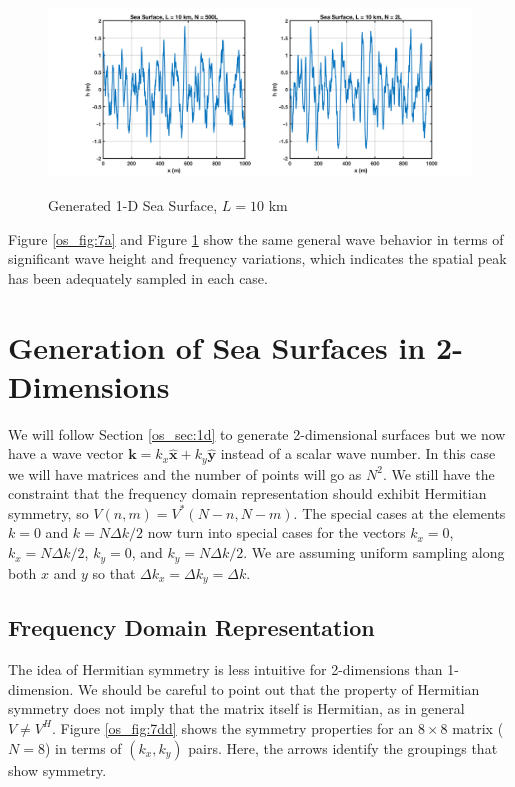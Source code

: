 \begin{figure}[H]
  \begin{center}
\includegraphics[width=6in]{../media/Ocean_Surface/sea_surface_10000.png}
  \end{center}
  \renewcommand{\baselinestretch}{1} \small\normalsize
  \begin{quote}
    \caption[Generated 1-D Sea Surface, $L = 10$ km]{Generated 1-D Sea Surface, $L = 10$ km\label{os_fig:7aa}}
  \end{quote}
\end{figure}
\renewcommand{\baselinestretch}{2} \small\normalsize

Figure \ref{os_fig:7a} and Figure \ref{os_fig:7aa} show the same general wave behavior in terms of significant wave height and frequency variations, which indicates the spatial peak has been adequately sampled in each case.

\section {Generation of Sea Surfaces in 2-Dimensions}
We will follow Section \ref{os_sec:1d} to generate 2-dimensional surfaces but we now have a wave vector $\mathbf{k} = k_x\hat{\mathbf{x}} + k_y\hat{\mathbf{y}}$ instead of a scalar wave number. In this case we will have matrices and the number of points will go as $N^2$. We still have the constraint that the frequency domain representation should exhibit Hermitian symmetry, so $V(n,m) = V^*(N-n,N-m)$. The special cases at the elements $k = 0$ and $k = N\Delta k/2$ now turn into special cases for the vectors $k_x = 0$, $k_x = N\Delta k/2$, $k_y = 0$, and $k_y = N\Delta k/2$. We are assuming uniform sampling along both $x$ and $y$ so that $\Delta k_x = \Delta k_y = \Delta k$.

\subsection {Frequency Domain Representation}
The idea of Hermitian symmetry is less intuitive for 2-dimensions than 1-dimension. We should be careful to point out that the property of Hermitian symmetry does not imply that the matrix itself is Hermitian, as in general $V \neq V^H$. Figure \ref{os_fig:7dd} shows the symmetry properties for an $8 \times 8$ matrix ($N = 8$) in terms of $(k_x, k_y)$ pairs. Here, the arrows identify the groupings that show symmetry. 

